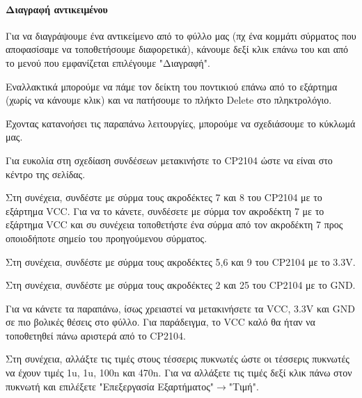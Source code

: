 \documentclass[a4paper]{article}
\begin{document}
\paragraph{Διαγραφή αντικειμένου}
Για να διαγράψουμε ένα αντικείμενο από το φύλλο μας (πχ ένα κομμάτι σύρματος που αποφασίσαμε να τοποθετήσουμε διαφορετικά), κάνουμε δεξί κλικ επάνω του και από το μενού που εμφανίζεται επιλέγουμε "Διαγραφή".

Εναλλακτικά μπορούμε να πάμε τον δείκτη του ποντικιού επάνω από το εξάρτημα (χωρίς να κάνουμε κλικ) και να πατήσουμε το πλήκτο Delete στο πληκτρολόγιο.

Έχοντας κατανοήσει τις παραπάνω λειτουργίες, μπορούμε να σχεδιάσουμε το κύκλωμά μας.

Για ευκολία στη σχεδίαση συνδέσεων μετακινήστε το CP2104 ώστε να είναι στο κέντρο της σελίδας.

Στη συνέχεια, συνδέστε με σύρμα τους ακροδέκτες 7 και 8 του CP2104 με το εξάρτημα VCC. Για να το κάνετε, συνδέσετε με σύρμα τον ακροδέκτη 7 με το εξάρτημα VCC και συ συνέχεια τοποθετήστε ένα σύρμα από τον  ακροδέκτη 7 προς οποιοδήποτε σημείο του προηγούμενου σύρματος.

Στη συνέχεια, συνδέστε με σύρμα τους ακροδέκτες 5,6 και 9 του CP2104 με το 3.3V.

Στη συνέχεια, συνδέστε με σύρμα τους ακροδέκτες 2 και 25 του CP2104 με το GND.

\begin{figure}
  \begin{center}
    \label{fig:kicad-main}
  \end{center}
\end{figure}

Για να κάνετε τα παραπάνω, ίσως χρειαστεί να μετακινήσετε τα VCC, 3.3V και GND σε πιο βολικές θέσεις στο φύλλο. Για παράδειγμα, το VCC καλό θα ήταν να τοποθετηθεί πάνω αριστερά από το CP2104.

\begin{figure}
  \begin{center}
    \label{fig:kicad-main}
  \end{center}
\end{figure}

Στη συνέχεια, αλλάξτε τις τιμές στους τέσσερις πυκνωτές ώστε οι τέσσερις πυκνωτές να έχουν τιμές 1u, 1u, 100n και 470n. Για να αλλάξετε τις τιμές δεξί κλικ πάνω στον πυκνωτή και επιλέξετε "Επεξεργασία Εξαρτήματος"$\rightarrow$"Τιμή".
\end{document}
